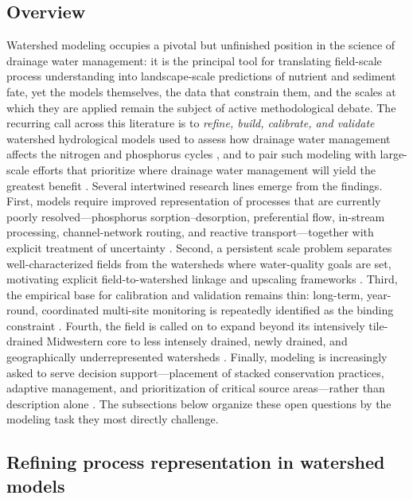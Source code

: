 \subsection{Overview}

Watershed modeling occupies a pivotal but unfinished position in the science of drainage water management: it is the principal tool for translating field-scale process understanding into landscape-scale predictions of nutrient and sediment fate, yet the models themselves, the data that constrain them, and the scales at which they are applied remain the subject of active methodological debate. The recurring call across this literature is to \emph{refine, build, calibrate, and validate} watershed hydrological models used to assess how drainage water management affects the nitrogen and phosphorus cycles \parencite{Sunohara2015}, and to pair such modeling with large-scale efforts that prioritize where drainage water management will yield the greatest benefit \parencite{Ross2016}. Several intertwined research lines emerge from the findings. First, models require improved representation of processes that are currently poorly resolved---phosphorus sorption--desorption, preferential flow, in-stream processing, channel-network routing, and reactive transport---together with explicit treatment of uncertainty \parencite{Wang2020b,Kujawa2020}. Second, a persistent scale problem separates well-characterized fields from the watersheds where water-quality goals are set, motivating explicit field-to-watershed linkage and upscaling frameworks \parencite{Williams2015,Kyllmar2023}. Third, the empirical base for calibration and validation remains thin: long-term, year-round, coordinated multi-site monitoring is repeatedly identified as the binding constraint \parencite{Christianson2015,Bauwe2020}. Fourth, the field is called on to expand beyond its intensively tile-drained Midwestern core to less intensely drained, newly drained, and geographically underrepresented watersheds \parencite{Kujawa2020,Christianson2015}. Finally, modeling is increasingly asked to serve decision support---placement of stacked conservation practices, adaptive management, and prioritization of critical source areas---rather than description alone \parencite{Kröger2013,Tomer2015}. The subsections below organize these open questions by the modeling task they most directly challenge.

\subsection{Refining process representation in watershed models}


